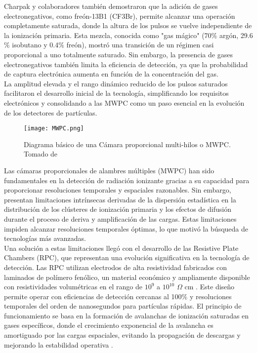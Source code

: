 \documentclass{report}
\begin{document}
\noindent Charpak y colaboradores \cite{charpak1974high} también demostraron que la adición de gases electronegativos, como freón-13B1 (CF3Br), permite alcanzar una operación completamente saturada, donde la altura de los pulsos se vuelve independiente de la ionización primaria. Esta mezcla, conocida como "gas mágico" (70$\%$ argón, 29.6$\%$ isobutano y 0.4$\%$ freón), mostró una transición de un régimen casi proporcional a uno totalmente saturado. Sin embargo, la presencia de gases electronegativos también limita la eficiencia de detección, ya que la probabilidad de captura electrónica aumenta en función de la concentración del gas.\\

\noindent La amplitud elevada y el rango dinámico reducido de los pulsos saturados facilitaron el desarrollo inicial de la tecnología, simplificando los requisitos electrónicos y consolidando a las MWPC como un paso esencial en la evolución de los detectores de partículas.\\

\begin{figure}[H]
    \centering
    \texttt{[image: MWPC.png]}
    \caption{Diagrama básico de una Cámara proporcional multi-hilos o MWPC. Tomado de \cite{hamid2013micromegas}}
    \label{fig:MWPC}
\end{figure}

\noindent Las cámaras proporcionales de alambres múltiples (MWPC) han sido fundamentales en la detección de radiación ionizante gracias a su capacidad para proporcionar resoluciones temporales y espaciales razonables. Sin embargo, presentan limitaciones intrínsecas derivadas de la dispersión estadística en la distribución de los clústeres de ionización primaria y los efectos de difusión durante el proceso de deriva y amplificación de las cargas. Estas limitaciones impiden alcanzar resoluciones temporales óptimas, lo que motivó la búsqueda de tecnologías más avanzadas. \\

\noindent Una solución a estas limitaciones llegó con el desarrollo de las Resistive Plate Chambers (RPC), que representan una evolución significativa en la tecnología de detección. Las RPC utilizan electrodos de alta resistividad fabricados con laminados de polímero fenólico, un material económico y ampliamente disponible con resistividades volumétricas en el rango de $10^9$ a $10^{10}$ $\Omega$ cm \cite{pestov2002review}. Este diseño permite operar con eficiencias de detección cercanas al 100$\%$ y resoluciones temporales del orden de nanosegundos para partículas rápidas. El principio de funcionamiento se basa en la formación de avalanchas de ionización saturadas en gases específicos, donde el crecimiento exponencial de la avalancha es amortiguado por las cargas espaciales, evitando la propagación de descargas y mejorando la estabilidad operativa \cite{pestov2002review}. \\
\end{document}
